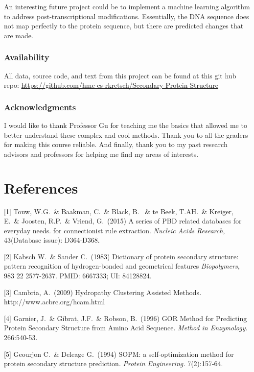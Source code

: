 \documentclass{article}
\begin{document}
An interesting future project could be to implement a machine learning algorithm to address post-transcriptional modifications. Essentially, the DNA sequence does not map perfectly to the protein sequence, but there are predicted changes that are made.


\subsubsection*{Availability}

All data, source code, and text from this project can be found at this git hub repo: \url{https://github.com/hmc-cs-rkretsch/Secondary-Protein-Structure}

\subsubsection*{Acknowledgments}

I would like to thank Professor Gu for teaching me the basics that allowed me to better understand these complex and cool methods. Thank you to all the graders for making this course reliable. And finally, thank you to my past research advisors and professors for helping me find my areas of interests.

\section*{References}

\small

[1] Touw, W.G.\ \& Baakman, C.\ \& Black, B. \ \& te Beek, T.AH.\ \& Kreiger, E.\ \& Joosten, R.P.\ \&
Vriend, G.\ (2015) A series of PBD related databases for everyday needs.
for connectionist rule extraction.  {\it Nucleic Acids Research}, 43(Database issue): D364-D368.

[2] Kabsch W.\ \& Sander C.\ (1983) Dictionary of protein secondary structure: pattern recognition of hydrogen-bonded and geometrical features {\it Biopolymers}, 983 22 2577-2637. PMID: 6667333; UI: 84128824.

[3] Cambria, A.\ (2009) Hydropathy Clustering Assisted Methods. http://www.acbrc.org/hcam.html

[4] Garnier, J.\ \& Gibrat, J.F.\ \& Robson, B.\ (1996) GOR Method for Predicting Protein Secondary Structure from Amino Acid Sequence. {\it Method in Enzymology}. 266:540-53.

[5] Geourjon C.\ \& Deleage G.\ (1994) SOPM: a self-optimization method for protein secondary structure prediction. {\it Protein Engineering.} 7(2):157-64.
\end{document}
